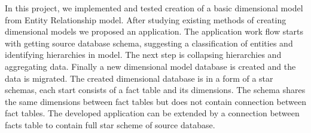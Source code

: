 In this project, we implemented and tested creation of a basic dimensional model from Entity Relationship model. After studying existing methods of creating dimensional models we proposed an application. The application work flow starts with getting source database schema, suggesting a classification of entities and identifying hierarchies in model. The next step is collapsing hierarchies and aggregating data. Finally a new dimensional model database is created and the data is migrated. 	The created dimensional database is in a form of a star schemas, each start consists of a fact table and its dimensions. The schema shares the same dimensions between fact tables but does not contain connection between fact tables.
	The developed application can be extended by a connection between facts table to contain full star scheme of source database.
  
